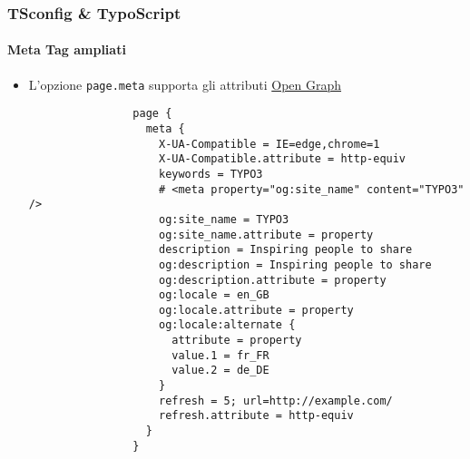 \begin{frame}[fragile]
	\frametitle{TSconfig \& TypoScript}
	\framesubtitle{Meta Tag ampliati}

	\lstset{basicstyle=\tiny\ttfamily}

	\begin{itemize}


		\item L'opzione \texttt{page.meta} supporta gli attributi \href{http://ogp.me}{Open Graph}

			\begin{lstlisting}
				page {
				  meta {
				    X-UA-Compatible = IE=edge,chrome=1
				    X-UA-Compatible.attribute = http-equiv
				    keywords = TYPO3
				    # <meta property="og:site_name" content="TYPO3" />
				    og:site_name = TYPO3
				    og:site_name.attribute = property
				    description = Inspiring people to share
				    og:description = Inspiring people to share
				    og:description.attribute = property
				    og:locale = en_GB
				    og:locale.attribute = property
				    og:locale:alternate {
				      attribute = property
				      value.1 = fr_FR
				      value.2 = de_DE
				    }
				    refresh = 5; url=http://example.com/
				    refresh.attribute = http-equiv
				  }
				}
			\end{lstlisting}

	\end{itemize}

\end{frame}


